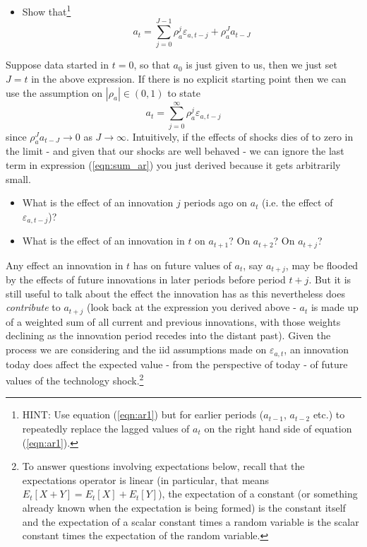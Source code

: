\documentclass[authoryear,11pt]{elsarticle}
\begin{document}
\begin{itemize}
\item	Show that\footnote{HINT: Use equation (\ref{eqn:ar1}) but for earlier periods ($a_{t-1}$, $a_{t-2}$ etc.) to repeatedly replace the lagged values of $a_{t}$ on the right hand side of equation (\ref{eqn:ar1}).}
\begin{equation}
a_{t} = \sum\limits_{j=0}^{J-1} \rho_{a}^{j} \varepsilon_{a,t-j} + \rho_{a}^{J} a_{t-J} \label{eqn:sum_ar}
\end{equation}
\end{itemize}

Suppose data started in $t=0$, so that $a_{0}$ is just given to us, then we just set $J=t$ in the above expression. If there is no explicit starting point then we can use the assumption on $|\rho_{a}| \in (0,1)$ to state
\[
a_{t} = \sum\limits_{j=0}^{\infty} \rho_{a}^{j} \varepsilon_{a,t-j}
\]
since $\rho_{a}^{J} a_{t-J} \to 0$ as $J \to \infty$. Intuitively, if the effects of shocks dies of to zero in the limit - and given that our shocks are well behaved - we can ignore the last term in expression (\ref{eqn:sum_ar}) you just derived because it gets arbitrarily small.

\begin{itemize}
\item	What is the effect of an innovation $j$ periods ago on $a_{t}$ (i.e. the effect of $\varepsilon_{a,t-j}$)?
\item	What is the effect of an innovation in $t$ on $a_{t+1}$? On $a_{t+2}$? On $a_{t+j}$?
\end{itemize}

Any effect an innovation in $t$ has on future values of $a_{t}$, say $a_{t+j}$,  may be flooded by the effects of future innovations in later periods before period $t+j$. But it is still useful to talk about the effect the innovation has as this nevertheless does \emph{contribute} to $a_{t+j}$ (look back at the expression you derived above - $a_{t}$ is made up of a weighted sum of all current and previous innovations, with those weights declining as the innovation period recedes into the distant past). Given the process we are considering and the iid assumptions made on $\varepsilon_{a,t}$, an innovation today does affect the expected value - from the perspective of today - of future values of the technology shock.\footnote{To answer questions involving expectations below, recall that the expectations operator is linear (in particular, that means $E_{t}[X + Y] = E_{t}[X] + E_{t}[Y]$), the expectation of a constant (or something already known when the expectation is being formed) is the constant itself and the expectation of a scalar constant times a random variable is the scalar constant times the expectation of the random variable.}
\end{document}
